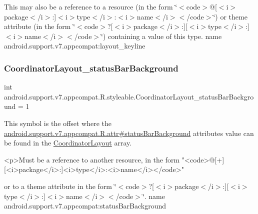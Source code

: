 This may also be a reference to a resource (in the form \char`\"{}$<$code$>$@\mbox{[}$<$i$>$package$<$/i$>$\+:\mbox{]}$<$i$>$type$<$/i$>$\+:$<$i$>$name$<$/i$>$$<$/code$>$\char`\"{}) or theme attribute (in the form \char`\"{}$<$code$>$?\mbox{[}$<$i$>$package$<$/i$>$\+:\mbox{]}\mbox{[}$<$i$>$type$<$/i$>$\+:\mbox{]}$<$i$>$name$<$/i$>$$<$/code$>$\char`\"{}) containing a value of this type.  name android.\+support.\+v7.\+appcompat\+:layout\+\_\+keyline \mbox{\label{classandroid_1_1support_1_1v7_1_1appcompat_1_1R_1_1styleable_a3cac0ac0b4683f1615bfd53649866096}} 
\subsubsection{\texorpdfstring{Coordinator\+Layout\+\_\+status\+Bar\+Background}{CoordinatorLayout\_statusBarBackground}}
{\footnotesize\ttfamily int android.\+support.\+v7.\+appcompat.\+R.\+styleable.\+Coordinator\+Layout\+\_\+status\+Bar\+Background = 1\hspace{0.3cm}{\ttfamily [static]}}

This symbol is the offset where the \hyperlink{classandroid_1_1support_1_1v7_1_1appcompat_1_1R_1_1attr_ae6ea5839099a688958923fba26f61fd5}{android.\+support.\+v7.\+appcompat.\+R.\+attr\#status\+Bar\+Background} attribute\textquotesingle{}s value can be found in the \hyperlink{classandroid_1_1support_1_1v7_1_1appcompat_1_1R_1_1styleable_a36909bd71e5ee18cc73ff4732b601a79}{Coordinator\+Layout} array.

\begin{DoxyVerb}      <p>Must be a reference to another resource, in the form "<code>@[+][<i>package</i>:]<i>type</i>:<i>name</i></code>"
\end{DoxyVerb}
 or to a theme attribute in the form \char`\"{}$<$code$>$?\mbox{[}$<$i$>$package$<$/i$>$\+:\mbox{]}\mbox{[}$<$i$>$type$<$/i$>$\+:\mbox{]}$<$i$>$name$<$/i$>$$<$/code$>$\char`\"{}.  name android.\+support.\+v7.\+appcompat\+:status\+Bar\+Background \mbox{\label{classandroid_1_1support_1_1v7_1_1appcompat_1_1R_1_1styleable_aff3ce11bdf266828d90b9a386168c4b0}} 
